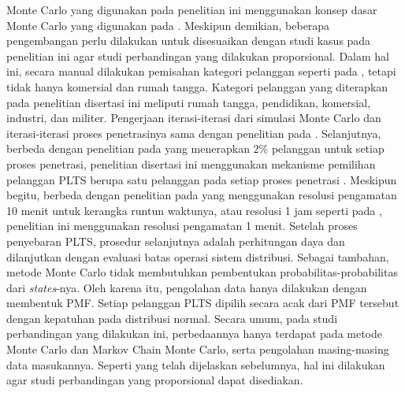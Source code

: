 {Monte Carlo yang digunakan pada penelitian ini menggunakan konsep dasar Monte Carlo yang digunakan pada \cite{Epri2012,Dubey2015,Dubey2017,Ding2017,Atmaja2019}. Meskipun demikian, beberapa pengembangan perlu dilakukan untuk disesuaikan dengan studi kasus pada penelitian ini agar studi perbandingan yang dilakukan proporsional. Dalam hal ini, secara manual dilakukan pemisahan kategori pelanggan seperti pada \cite{Epri2012,Dubey2015}, tetapi tidak hanya komersial dan rumah tangga. Kategori pelanggan yang diterapkan pada penelitian disertasi ini meliputi rumah tangga, pendidikan, komersial, industri, dan militer. Pengerjaan iterasi-iterasi dari simulasi Monte Carlo dan iterasi-iterasi proses penetrasinya sama dengan penelitian pada \cite{Dubey2017,Ding2017,Atmaja2019}. Selanjutnya, berbeda dengan penelitian pada \cite{Dubey2017,Ding2017} yang menerapkan 2\% pelanggan untuk setiap proses penetrasi, penelitian disertasi ini menggunakan mekanisme pemilihan pelanggan PLTS berupa satu pelanggan pada setiap proses penetrasi \cite{Atmaja2019}. Meskipun begitu, berbeda dengan penelitian pada \cite{Atmaja2019} yang menggunakan resolusi pengamatan 10 menit untuk kerangka runtun waktunya, atau resolusi 1 jam seperti pada \cite{Dubey2017}, penelitian ini menggunakan resolusi pengamatan 1 menit. Setelah proses penyebaran PLTS, prosedur selanjutnya adalah perhitungan daya dan dilanjutkan dengan evaluasi batas operasi sistem distribusi. Sebagai tambahan, metode Monte Carlo tidak membutuhkan pembentukan probabilitas-probabilitas dari \textit{states}-nya. Oleh karena itu, pengolahan data hanya dilakukan dengan membentuk PMF. Setiap pelanggan PLTS dipilih secara acak dari PMF tersebut dengan kepatuhan pada distribusi normal. Secara umum, pada studi perbandingan yang dilakukan ini, perbedaannya hanya terdapat pada metode Monte Carlo dan Markov Chain Monte Carlo, serta pengolahan masing-masing data masukannya. Seperti yang telah dijelaskan sebelumnya, hal ini dilakukan agar studi perbandingan yang proporsional dapat disediakan.

}
